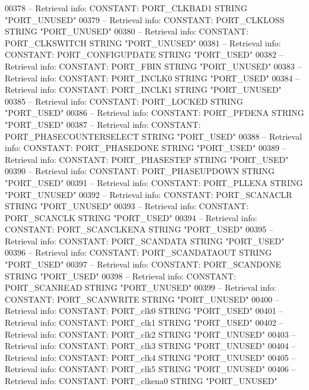 \begin{DoxyCode}
{00378 \textcolor{keyword}{-- Retrieval info: CONSTANT: PORT\_CLKBAD1 STRING "PORT\_UNUSED"}
00379 \textcolor{keyword}{-- Retrieval info: CONSTANT: PORT\_CLKLOSS STRING "PORT\_UNUSED"}
00380 \textcolor{keyword}{-- Retrieval info: CONSTANT: PORT\_CLKSWITCH STRING "PORT\_UNUSED"}
00381 \textcolor{keyword}{-- Retrieval info: CONSTANT: PORT\_CONFIGUPDATE STRING "PORT\_USED"}
00382 \textcolor{keyword}{-- Retrieval info: CONSTANT: PORT\_FBIN STRING "PORT\_UNUSED"}
00383 \textcolor{keyword}{-- Retrieval info: CONSTANT: PORT\_INCLK0 STRING "PORT\_USED"}
00384 \textcolor{keyword}{-- Retrieval info: CONSTANT: PORT\_INCLK1 STRING "PORT\_UNUSED"}
00385 \textcolor{keyword}{-- Retrieval info: CONSTANT: PORT\_LOCKED STRING "PORT\_USED"}
00386 \textcolor{keyword}{-- Retrieval info: CONSTANT: PORT\_PFDENA STRING "PORT\_USED"}
00387 \textcolor{keyword}{-- Retrieval info: CONSTANT: PORT\_PHASECOUNTERSELECT STRING "PORT\_USED"}
00388 \textcolor{keyword}{-- Retrieval info: CONSTANT: PORT\_PHASEDONE STRING "PORT\_USED"}
00389 \textcolor{keyword}{-- Retrieval info: CONSTANT: PORT\_PHASESTEP STRING "PORT\_USED"}
00390 \textcolor{keyword}{-- Retrieval info: CONSTANT: PORT\_PHASEUPDOWN STRING "PORT\_USED"}
00391 \textcolor{keyword}{-- Retrieval info: CONSTANT: PORT\_PLLENA STRING "PORT\_UNUSED"}
00392 \textcolor{keyword}{-- Retrieval info: CONSTANT: PORT\_SCANACLR STRING "PORT\_UNUSED"}
00393 \textcolor{keyword}{-- Retrieval info: CONSTANT: PORT\_SCANCLK STRING "PORT\_USED"}
00394 \textcolor{keyword}{-- Retrieval info: CONSTANT: PORT\_SCANCLKENA STRING "PORT\_USED"}
00395 \textcolor{keyword}{-- Retrieval info: CONSTANT: PORT\_SCANDATA STRING "PORT\_USED"}
00396 \textcolor{keyword}{-- Retrieval info: CONSTANT: PORT\_SCANDATAOUT STRING "PORT\_USED"}
00397 \textcolor{keyword}{-- Retrieval info: CONSTANT: PORT\_SCANDONE STRING "PORT\_USED"}
00398 \textcolor{keyword}{-- Retrieval info: CONSTANT: PORT\_SCANREAD STRING "PORT\_UNUSED"}
00399 \textcolor{keyword}{-- Retrieval info: CONSTANT: PORT\_SCANWRITE STRING "PORT\_UNUSED"}
00400 \textcolor{keyword}{-- Retrieval info: CONSTANT: PORT\_clk0 STRING "PORT\_USED"}
00401 \textcolor{keyword}{-- Retrieval info: CONSTANT: PORT\_clk1 STRING "PORT\_USED"}
00402 \textcolor{keyword}{-- Retrieval info: CONSTANT: PORT\_clk2 STRING "PORT\_UNUSED"}
00403 \textcolor{keyword}{-- Retrieval info: CONSTANT: PORT\_clk3 STRING "PORT\_UNUSED"}
00404 \textcolor{keyword}{-- Retrieval info: CONSTANT: PORT\_clk4 STRING "PORT\_UNUSED"}
00405 \textcolor{keyword}{-- Retrieval info: CONSTANT: PORT\_clk5 STRING "PORT\_UNUSED"}
00406 \textcolor{keyword}{-- Retrieval info: CONSTANT: PORT\_clkena0 STRING "PORT\_UNUSED"}
}
\end{DoxyCode}
